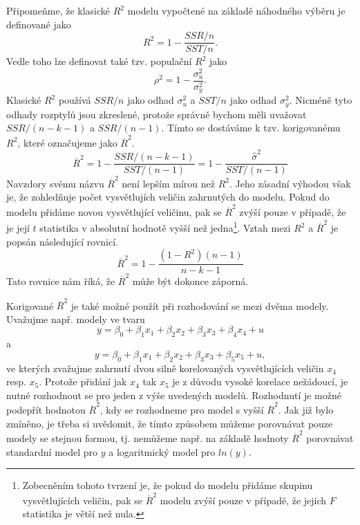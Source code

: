 Připomeňme, že klasické $R^2$ modelu vypočtené na základě náhodného výběru je definované jako
\begin{equation}
R^2 = 1 - \frac{SSR/n}{SST/n}.
\end{equation}
Vedle toho lze definovat také tzv. populační $R^2$ jako
\begin{equation}
\rho^2 = 1 - \frac{\sigma_u^2}{\sigma_y^2}.
\end{equation}
Klasické $R^2$ používá $SSR/n$ jako odhad $\sigma_u^2$ a $SST/n$ jako odhad $\sigma_y^2$. Nicméně tyto odhady rozptylů jsou zkreslené, 
protože správně bychom měli uvažovat $SSR/(n - k - 1)$ a $SSR/(n - 1)$. Tímto se dostáváme k tzv. korigovanému $R^2$, které označujeme 
jako $\overline{R}^2$.
\begin{equation}
\overline{R}^2 = 1 - \frac{SSR/(n - k - 1)}{SST / (n - 1)} = 1 - \frac{\hat{\sigma}^2}{SST / (n - 1)}
\end{equation}
Navzdory svému názvu $\overline{R}^2$ není lepším mírou než $R^2$. Jeho zásadní výhodou však je, že zohledňuje počet vysvětlujích 
veličin zahrnutých do modelu. Pokud do modelu přidáme novou vysvětlující veličinu, pak se $\overline{R}^2$ zvýší pouze v případě, že 
je její $t$ statistika v absolutní hodnotě vyšší než jedna\footnote{Zobecněním tohoto tvrzení je, že pokud do modelu přidáme skupinu 
vysvětlujících veličin, pak se $\overline{R}^2$ modelu zvýší pouze v případě, že jejich $F$ statistika je větší než nula.}. Vztah mezi 
$R^2$ a $\overline{R}^2$ je popsán následující rovnicí.
\begin{equation}
\overline{R}^2 = 1 - \frac{(1 - R^2)(n - 1)}{n - k - 1}
\end{equation}
Tato rovnice nám říká, že $\overline{R}^2$ může být dokonce záporná.

Korigované $\overline{R}^2$ je také možné použít při rozhodování se mezi dvěma modely. Uvažujme např. modely ve tvaru
\begin{equation}
y = \beta_0 + \beta_1 x_1 + \beta_2 x_2 + \beta_3 x_3 + \beta_4 x_4 + u
\end{equation}
a
\begin{equation}
y = \beta_0 + \beta_1 x_1 + \beta_2 x_2 + \beta_3 x_3 + \beta_5 x_5 + u,
\end{equation}
ve kterých zvažujme zahrnutí dvou silně korelovaných vysvětlujících veličin $x_4$ resp. $x_5$. Protože 
přidání jak $x_4$ tak $x_5$ je z důvodu vysoké korelace nežádoucí, je nutné rozhodnout se pro jeden z výše uvedených modelů. Rozhodnutí 
je možné podepřít hodnotou $\overline{R}^2$, kdy se rozhodneme pro model s vyšší $\overline{R}^2$. Jak již bylo zmíněno, je třeba si 
uvědomit, že tímto způsobem můžeme porovnávat pouze modely se stejnou formou, tj. nemůžeme např. na základě hodnoty 
$\overline{R}^2$ porovnávat standardní model pro $y$ a logaritmický model pro $ln(y)$.

